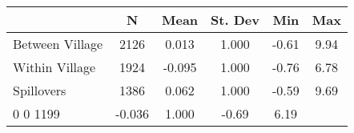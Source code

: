 \begin{tabular}{l*{5}{c}}\hline&\multicolumn{1}{c}{N}&\multicolumn{1}{c}{Mean}&\multicolumn{1}{c}{St. Dev}&\multicolumn{1}{c}{Min}&\multicolumn{1}{c}{Max}\\ \hline 
Between Village & 2126 & 0.013 & 1.000 & -0.61 & 9.94 \\
Within Village & 1924 & -0.095 & 1.000 & -0.76 & 6.78 \\
Spillovers & 1386 & 0.062 & 1.000 & -0.59 & 9.69 \\
0 0 1199 & -0.036 & 1.000 & -0.69 & 6.19 \\
\hline \end{tabular}
